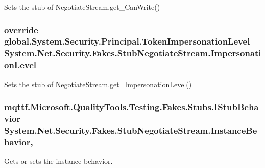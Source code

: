 Sets the stub of Negotiate\-Stream.\-get\-\_\-\-Can\-Write()

\hypertarget{class_system_1_1_net_1_1_security_1_1_fakes_1_1_stub_negotiate_stream_a847228f4de1ef25435f3d5529943179a}{
\subsubsection[{Impersonation\-Level}]{\setlength{\rightskip}{0pt plus 5cm}override global.\-System.\-Security.\-Principal.\-Token\-Impersonation\-Level System.\-Net.\-Security.\-Fakes.\-Stub\-Negotiate\-Stream.\-Impersonation\-Level\hspace{0.3cm}{\ttfamily [get]}}}\label{class_system_1_1_net_1_1_security_1_1_fakes_1_1_stub_negotiate_stream_a847228f4de1ef25435f3d5529943179a}


Sets the stub of Negotiate\-Stream.\-get\-\_\-\-Impersonation\-Level()

\hypertarget{class_system_1_1_net_1_1_security_1_1_fakes_1_1_stub_negotiate_stream_a8124169f92fd46e4f4a81d8c0d291bde}{
\subsubsection[{Instance\-Behavior}]{\setlength{\rightskip}{0pt plus 5cm}mqttf.\-Microsoft.\-Quality\-Tools.\-Testing.\-Fakes.\-Stubs.\-I\-Stub\-Behavior System.\-Net.\-Security.\-Fakes.\-Stub\-Negotiate\-Stream.\-Instance\-Behavior\hspace{0.3cm}{\ttfamily [get]}, {\ttfamily [set]}}}\label{class_system_1_1_net_1_1_security_1_1_fakes_1_1_stub_negotiate_stream_a8124169f92fd46e4f4a81d8c0d291bde}


Gets or sets the instance behavior.

